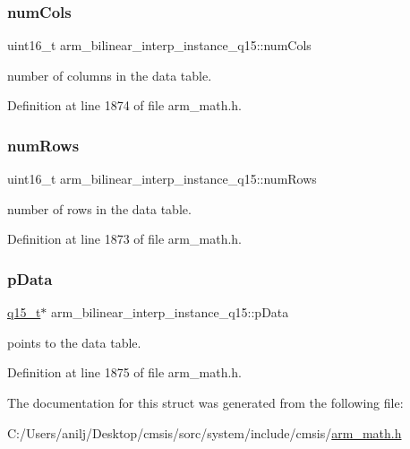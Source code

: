 \subsubsection{\texorpdfstring{num\+Cols}{numCols}}
{\footnotesize\ttfamily uint16\+\_\+t arm\+\_\+bilinear\+\_\+interp\+\_\+instance\+\_\+q15\+::num\+Cols}

number of columns in the data table. 

Definition at line 1874 of file arm\+\_\+math.\+h.

\mbox{\label{structarm__bilinear__interp__instance__q15_a2130ae30a804995a9f5d0e2189e08565}} 
\subsubsection{\texorpdfstring{num\+Rows}{numRows}}
{\footnotesize\ttfamily uint16\+\_\+t arm\+\_\+bilinear\+\_\+interp\+\_\+instance\+\_\+q15\+::num\+Rows}

number of rows in the data table. 

Definition at line 1873 of file arm\+\_\+math.\+h.

\mbox{\label{structarm__bilinear__interp__instance__q15_a50d75b1316cee3e0dfad6dcc4c9a2954}} 
\subsubsection{\texorpdfstring{p\+Data}{pData}}
{\footnotesize\ttfamily \hyperlink{arm__math_8h_ab5a8fb21a5b3b983d5f54f31614052ea}{q15\+\_\+t}$\ast$ arm\+\_\+bilinear\+\_\+interp\+\_\+instance\+\_\+q15\+::p\+Data}

points to the data table. 

Definition at line 1875 of file arm\+\_\+math.\+h.



The documentation for this struct was generated from the following file\+:\begin{DoxyCompactItemize}
\item 
C\+:/\+Users/anilj/\+Desktop/cmsis/sorc/system/include/cmsis/\hyperlink{arm__math_8h}{arm\+\_\+math.\+h}\end{DoxyCompactItemize}
